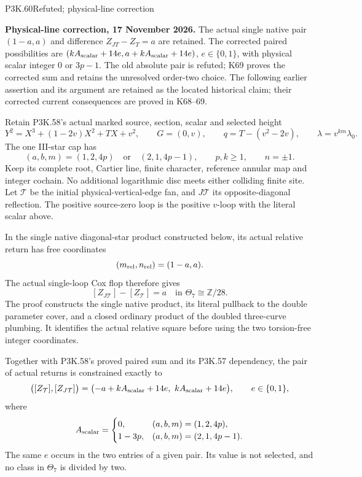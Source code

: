\begin{statement}{P3K.60}{Refuted; physical-line correction}\par\noindent\textbf{Physical-line correction, 17 November 2026.} The actual single native pair \((1-a,a)\) and difference \(Z_{JT}-Z_T=a\) are retained. The corrected paired possibilities are \((kA_{\rm scalar}+14e,a+kA_{\rm scalar}+14e)\), \(e\in\{0,1\}\), with physical scalar integer \(0\) or \(3p-1\). The old absolute pair is refuted; K69 proves the corrected sum and retains the unresolved order-two choice. The following earlier assertion and its argument are retained as the located historical claim; their corrected current consequences are proved in K68--69.\medskip\par 

Retain P3K.58's actual marked source, section, scalar and selected height
\[
 Y^2=X^3+(1-2v)X^2+TX+v^2,\qquad G=(0,v),\qquad
 q=T-(v^2-2v),\qquad \lambda=v^{km}\lambda_0 .
\]
The one III-star cap has
\[
 (a,b,m)=(1,2,4p)\quad\text{or}\quad(2,1,4p-1),
 \qquad p,k\ge1,\qquad n=\pm1 .
\]
Keep its complete root, Cartier line, finite character, reference
annular map and integer cochain. No additional logarithmic disc
meets either colliding finite site. Let \(\mathcal T\) be the initial
physical-vertical-edge fan, and \(J\mathcal T\) its opposite-diagonal
reflection. The positive source-zero loop is the positive \(v\)-loop
with the literal scalar above.

In the single native diagonal-star product constructed below, its
actual relative return has free coordinates
\[
                              (m_{\rm rel},n_{\rm rel})=(1-a,a).
\]
The actual single-loop Cox flop therefore gives
\[
                   [Z_{J\mathcal T}]-[Z_{\mathcal T}]
                                  =a\quad\text{in }\Theta_7\cong\mathbb Z/28.
\]
The proof constructs the single native product, its literal pullback
to the double parameter cover, and a closed ordinary product of
the doubled three-curve plumbing. It identifies the actual relative
square before using the two torsion-free integer coordinates.

Together with P3K.58's proved paired sum and its P3K.57 dependency,
the pair of actual returns is constrained exactly to
\[
 \bigl([Z_{\mathcal T}],[Z_{J\mathcal T}]\bigr)
   =\bigl(-a+kA_{\rm scalar}+14e,\ kA_{\rm scalar}+14e\bigr),
       \qquad e\in\{0,1\},
\]
where
\[
 A_{\rm scalar}=
 \begin{cases}
 0,&(a,b,m)=(1,2,4p),\\
 1-3p,&(a,b,m)=(2,1,4p-1).
 \end{cases}
\]
The same \(e\) occurs in the two entries of a given pair. Its value
is not selected, and no class in \(\Theta_7\) is divided by two.
\end{statement}
